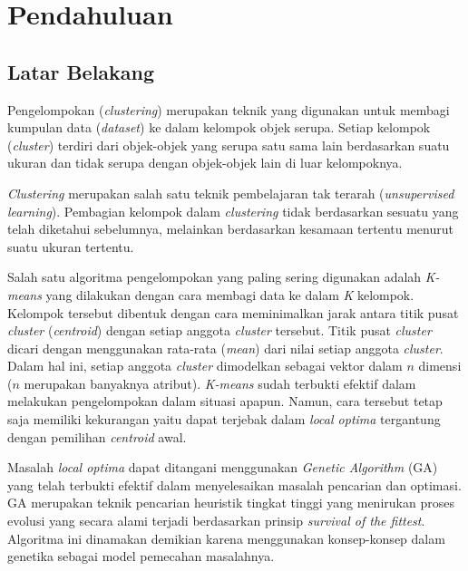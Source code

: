 \chapter{Pendahuluan}
\label{chap:intro}
   
\section{Latar Belakang}
\label{sec:label}

Pengelompokan (\textit{clustering}) merupakan teknik yang digunakan untuk membagi kumpulan data (\textit{dataset}) ke dalam kelompok objek serupa. Setiap kelompok (\textit{cluster}) terdiri dari objek-objek yang serupa satu sama lain berdasarkan suatu ukuran dan tidak serupa dengan objek-objek lain di luar kelompoknya.

\textit{Clustering} merupakan salah satu teknik pembelajaran tak terarah (\textit{unsupervised learning}). Pembagian kelompok dalam \textit{clustering} tidak berdasarkan sesuatu yang telah diketahui sebelumnya, melainkan berdasarkan kesamaan tertentu menurut suatu ukuran tertentu\cite{raposo2014automatic}.

Salah satu algoritma pengelompokan yang paling sering digunakan adalah \textit{K-means} yang dilakukan dengan cara membagi data ke dalam \textit{K} kelompok. Kelompok tersebut dibentuk dengan cara meminimalkan jarak antara titik pusat \textit{cluster} (\textit{centroid}) dengan setiap anggota \textit{cluster} tersebut. Titik pusat \textit{cluster} dicari dengan menggunakan rata-rata (\textit{mean}) dari nilai setiap anggota \textit{cluster}. Dalam hal ini, setiap anggota \textit{cluster} dimodelkan sebagai vektor dalam $n$ dimensi ($n$ merupakan banyaknya atribut). \textit{K-means} sudah terbukti efektif dalam melakukan pengelompokan  dalam situasi apapun. Namun, cara tersebut tetap saja memiliki kekurangan yaitu dapat terjebak dalam \textit{local optima} tergantung dengan pemilihan \textit{centroid} awal.\cite{maulik2000genetic}

Masalah \textit{local optima} dapat ditangani menggunakan \textit{Genetic Algorithm} (GA) yang telah terbukti efektif dalam menyelesaikan masalah pencarian dan optimasi. GA merupakan teknik pencarian heuristik tingkat tinggi yang menirukan proses evolusi yang secara alami terjadi\cite{holland1992genetic} berdasarkan prinsip \textit{survival of the fittest}. Algoritma ini dinamakan demikian karena menggunakan konsep-konsep dalam genetika sebagai model pemecahan masalahnya. \cite{sivanandam2007introduction}

